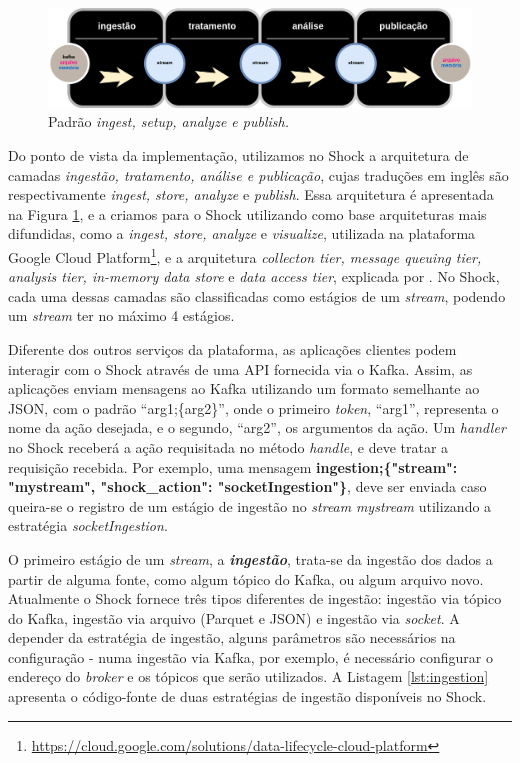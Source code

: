 \begin{figure}[hbt]
  \centering
  \includegraphics[scale=0.35]{figuras/arquiteturaforensic.png}
  \caption{Padrão \textit{ingest, setup, analyze e publish.}}
  \label{fig:ingeststore}
\end{figure}

Do ponto de vista da implementação, utilizamos no Shock a arquitetura de camadas
\textit{ingestão, tratamento, análise e publicação}, cujas traduções em inglês são
respectivamente \textit{ingest, store, analyze} e \textit{publish}. Essa arquitetura
é apresentada na Figura \ref{fig:ingeststore}, e a criamos para o Shock utilizando
como base arquiteturas mais difundidas, como a \textit{ingest, store, analyze} e
\textit{visualize}, utilizada na plataforma Google Cloud
Platform\footnote{\url{https://cloud.google.com/solutions/data-lifecycle-cloud-platform}},
e a arquitetura \textit{collecton tier, message queuing tier, analysis tier,
in-memory data store} e \textit{data access tier}, explicada por
. No Shock, cada uma dessas camadas são
classificadas como estágios de um \textit{stream}, podendo um
\textit{stream} ter no máximo 4 estágios.

Diferente dos outros serviços da plataforma, as aplicações clientes podem interagir
com o Shock através de uma API fornecida via o Kafka. Assim, as aplicações enviam
mensagens ao Kafka utilizando um formato semelhante ao JSON, com o padrão ``arg1;\{arg2\}'',
onde o primeiro \textit{token}, ``arg1'', representa o nome
da ação desejada, e o segundo, ``arg2'', os argumentos da ação. Um
\textit{handler} no Shock receberá a ação requisitada no método
\textit{handle}, e deve tratar a requisição recebida. Por exemplo, uma mensagem
\small{\textbf{ingestion;\{"stream": "mystream", "shock\_action": "socketIngestion"\}}},
deve ser enviada caso queira-se o registro de um estágio de ingestão no
\textit{stream} \textit{mystream} utilizando a estratégia \textit{socketIngestion}.



O primeiro estágio de um \textit{stream}, a \textit{\textbf{ingestão}}, trata-se da
ingestão dos dados a partir de alguma fonte, como algum tópico do Kafka, ou
algum arquivo novo. Atualmente o Shock fornece três tipos diferentes de
ingestão: ingestão via tópico do Kafka, ingestão via arquivo (Parquet e JSON)
e ingestão via \textit{socket}. A depender da estratégia de ingestão, alguns
parâmetros são necessários na configuração - numa ingestão via Kafka, por
exemplo, é necessário configurar o endereço do \textit{broker} e os tópicos
que serão utilizados. A Listagem \ref{lst:ingestion} apresenta o código-fonte
de duas estratégias de ingestão disponíveis no Shock.

